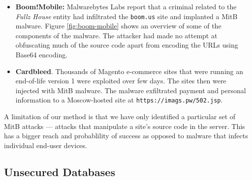 \begin{itemize}
\item \textbf{Boom!\;Mobile:} Malwarebytes Labs report \cite{team_mobile_2020} that a criminal related to the \textit{Fullz House} entity had infiltrated the \texttt{boom.us} site and implanted a MitB malware. Figure \ref{fig:boom-mobile} shows an overview of some of the components of the malware. The attacker had made no attempt at obfuscating much of the source code apart from encoding the URLs using Base64 encoding.

\item \textbf{Cardbleed}. Thousands of Magento e-commerce sites that were running an end-of-life version 1 were exploited over few days. The sites then were injected with MitB malware. The malware exfiltrated payment and personal information to a Moscow-hosted site at \texttt{https://imags.pw/502.jsp}.
\end{itemize}

A limitation of our method is that we have only identified a particular
set of MitB attacks --- attacks that manipulate a site's source code in
the server. This has a bigger reach and probablility of success as
opposed to malware that infects individual end-user devices.


\subsection{Unsecured Databases}
\label{sec::chp3::unsecured-db}

